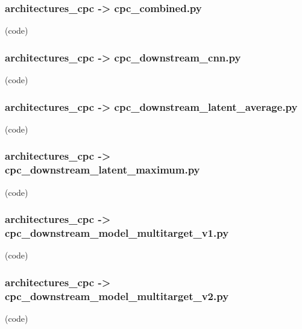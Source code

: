 \begin{myparindent}{0pt}

\noindent\subsubsection[cpc\_combined.py]{architectures\_cpc -> cpc\_combined.py} (code)

\noindent\subsubsection[cpc\_downstream\_cnn.py]{architectures\_cpc -> cpc\_downstream\_cnn.py} (code)

\noindent\subsubsection[cpc\_downstream\_latent\_average.py]{architectures\_cpc -> cpc\_downstream\_latent\_average.py} (code)

\noindent\subsubsection[cpc\_downstream\_latent\_maximum.py]{architectures\_cpc -> cpc\_downstream\_latent\_maximum.py} (code)

\noindent\subsubsection[cpc\_downstream\_model\_multitarget\_v1.py]{architectures\_cpc -> cpc\_downstream\_model\_multitarget\_v1.py} (code)

\noindent\subsubsection[cpc\_downstream\_model\_multitarget\_v2.py]{architectures\_cpc -> cpc\_downstream\_model\_multitarget\_v2.py} (code)


\end{myparindent}
